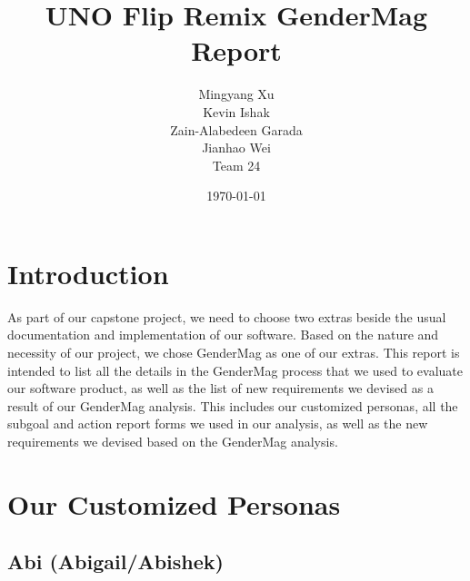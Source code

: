 \documentclass[12pt, titlepage]{article}
\begin{document}
\title{UNO Flip Remix GenderMag Report}
\author{Mingyang Xu\\ Kevin Ishak\\ Zain-Alabedeen Garada\\ Jianhao Wei\\ Team 24}

\date{\today}

\maketitle


\tableofcontents

\listoftables %

\listoffigures %

\newpage


\section{Introduction}
As part of our capstone project, we need to choose two extras beside the usual documentation and implementation of our software. Based on the nature and necessity of our project, we chose GenderMag as one of our extras. This report is intended to list all the details in the GenderMag process that we used to evaluate our software product, as well as the list of new requirements we devised as a result of our GenderMag analysis. This includes our customized personas, all the subgoal and action report forms we used in our analysis, as well as the new requirements we devised based on the GenderMag analysis.

\section{Our Customized Personas}
\subsection{Abi (Abigail/Abishek)}
\end{document}
